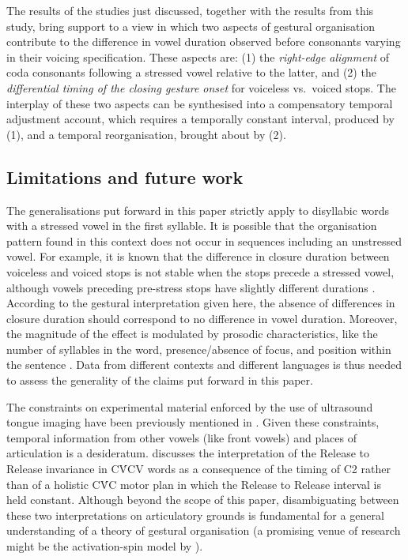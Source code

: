 \documentclass[12pt,]{article}
\begin{document}
The results of the studies just discussed, together with the results
from this study, bring support to a view in which two aspects of
gestural organisation contribute to the difference in vowel duration
observed before consonants varying in their voicing specification. These
aspects are: (1) the \emph{right-edge alignment} of coda consonants
following a stressed vowel relative to the latter, and (2) the
\emph{differential timing of the closing gesture onset} for voiceless
vs.~voiced stops. The interplay of these two aspects can be synthesised
into a compensatory temporal adjustment account, which requires a
temporally constant interval, produced by (1), and a temporal
reorganisation, brought about by (2).

\hypertarget{limitations-and-future-work}{%
\subsection{Limitations and future
work}\label{limitations-and-future-work}}

The generalisations put forward in this paper strictly apply to
disyllabic words with a stressed vowel in the first syllable. It is
possible that the organisation pattern found in this context does not
occur in sequences including an unstressed vowel. For example, it is
known that the difference in closure duration between voiceless and
voiced stops is not stable when the stops precede a stressed vowel,
although vowels preceding pre-stress stops have slightly different
durations \citep{davis1989}. According to the gestural interpretation
given here, the absence of differences in closure duration should
correspond to no difference in vowel duration. Moreover, the magnitude
of the effect is modulated by prosodic characteristics, like the number
of syllables in the word, presence/absence of focus, and position within
the sentence \citep{sharf1962, klatt1973, laeufer1992, de-jong2004}.
Data from different contexts and different languages is thus needed to
assess the generality of the claims put forward in this paper.

The constraints on experimental material enforced by the use of
ultrasound tongue imaging have been previously mentioned in
. Given these constraints, temporal information from
other vowels (like front vowels) and places of articulation is a
desideratum.  discusses the interpretation of the
Release to Release invariance in CV́CV words as a consequence of the
timing of C2 rather than of a holistic CV́C motor plan in which the
Release to Release interval is held constant. Although beyond the scope
of this paper, disambiguating between these two interpretations on
articulatory grounds is fundamental for a general understanding of a
theory of gestural organisation (a promising venue of research might be
the activation-spin model by \citealt{tilsen2013}).
\end{document}
